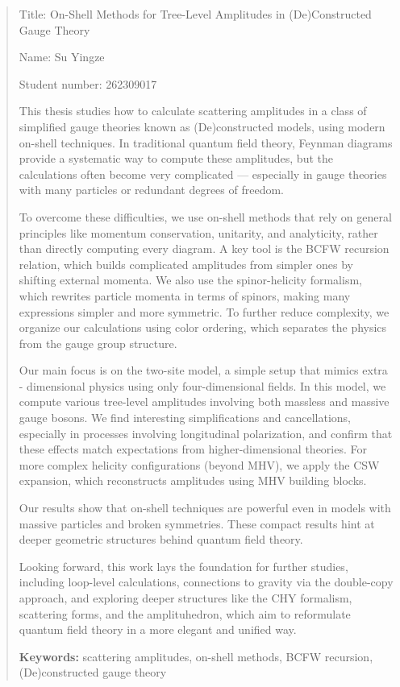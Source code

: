 \documentclass[12pt]{article}
\numberwithin{equation}{section}
\begin{document}
\begin{abstract}
\normalsize
\noindent
Title: On-Shell Methods for Tree-Level Amplitudes in (De)Constructed Gauge Theory

\noindent
Name: Su Yingze

\noindent
Student number: 262309017

This thesis studies how to calculate scattering amplitudes in a class of simplified gauge theories known as (De)constructed models, using modern on-shell techniques. In traditional quantum field theory, Feynman diagrams provide a systematic way to compute these amplitudes, but the calculations often become very complicated — especially in gauge theories with many particles or redundant degrees of freedom.

To overcome these difficulties, we use on-shell methods that rely on general principles like momentum conservation, unitarity, and analyticity, rather than directly computing every diagram. A key tool is the BCFW recursion relation, which builds complicated amplitudes from simpler ones by shifting external momenta. We also use the spinor-helicity formalism, which rewrites particle momenta in terms of spinors, making many expressions simpler and more symmetric. To further reduce complexity, we organize our calculations using color ordering, which separates the physics from the gauge group structure.

Our main focus is on the two-site model, a simple setup that mimics extra - dimensional physics using only four-dimensional fields. In this model, we compute various tree-level amplitudes involving both massless and massive gauge bosons. We find interesting simplifications and cancellations, especially in processes involving longitudinal polarization, and confirm that these effects match expectations from higher-dimensional theories. For more complex helicity configurations (beyond MHV), we apply the CSW expansion, which reconstructs amplitudes using MHV building blocks.

Our results show that on-shell techniques are powerful even in models with massive particles and broken symmetries. These compact results hint at deeper geometric structures behind quantum field theory.

Looking forward, this work lays the foundation for further studies, including loop-level calculations, connections to gravity via the double-copy approach, and exploring deeper structures like the CHY formalism, scattering forms, and the amplituhedron, which aim to reformulate quantum field theory in a more elegant and unified way.



\textbf{Keywords:} scattering amplitudes, on-shell methods, BCFW recursion,  (De)constructed gauge theory

    
\end{abstract}
\newpage
\tableofcontents
\newpage
\end{document}
